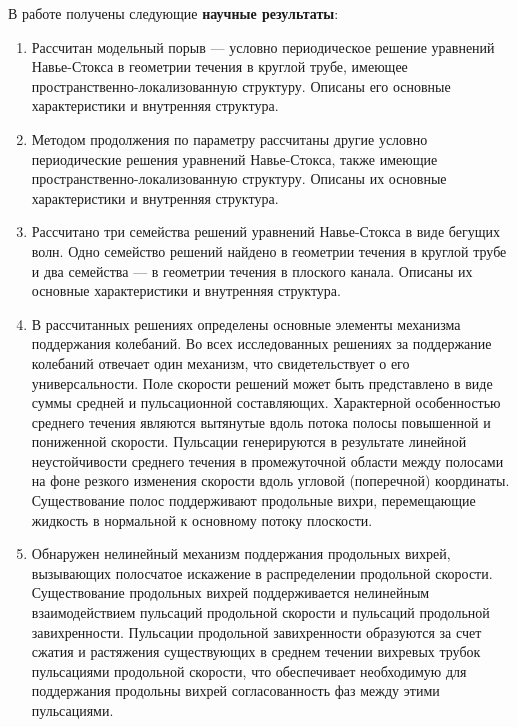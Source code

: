 В работе получены следующие {\bf научные результаты}:
\begin{enumerate}
\item Рассчитан модельный порыв --- условно периодическое решение уравнений Навье-Стокса в геометрии течения в круглой трубе, имеющее пространственно-локализованную структуру. Описаны его основные характеристики и внутренняя структура. 
\item Методом продолжения по параметру рассчитаны другие условно периодические решения уравнений Навье-Стокса, также имеющие про\-странственно-локализованную структуру. Описаны их основные характеристики и внутренняя структура. 
\item Рассчитано три семейства решений уравнений Навье-Стокса в виде бегущих волн. Одно семейство решений найдено в геометрии течения в круглой трубе и два семейства --- в геометрии течения в плоского канала. Описаны их основные характеристики и внутренняя структура. 
\item В рассчитанных решениях определены основные элементы механизма поддержания колебаний. Во всех исследованных решениях за поддержание колебаний отвечает один механизм, что свидетельствует о его универсальности. 
Поле скорости решений может быть представлено в виде суммы средней и пульсационной составляющих. Характерной особенностью среднего течения являются вытянутые вдоль потока полосы повышенной и пониженной скорости. Пульсации генерируются в результате линейной неустойчивости среднего течения в промежуточной области между полосами на фоне резкого изменения скорости вдоль угловой (поперечной) координаты. Существование полос поддерживают продольные вихри, перемещающие жидкость в нормальной к основному потоку плоскости.
\item Обнаружен нелинейный механизм поддержания продольных вихрей, вызывающих полосчатое искажение в распределении продольной скорости. Существование продольных вихрей поддерживается нелинейным взаимодействием пульсаций продольной скорости и пульсаций продольной завихренности. Пульсации продольной завихренности образуются за счет сжатия и растяжения существующих в среднем течении вихревых трубок пульсациями продольной скорости, что обеспечивает необходимую для поддержания продольны вихрей согласованность фаз между этими пульсациями. 
\end{enumerate}

